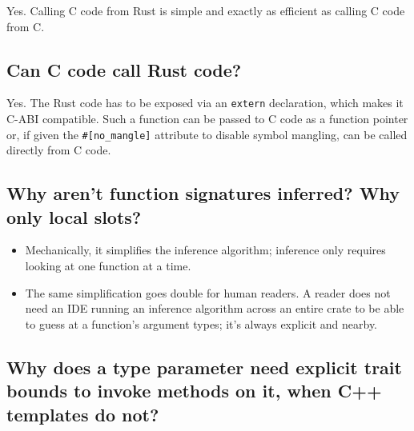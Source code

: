 \documentclass[]{article}
\begin{document}
Yes. Calling C code from Rust is simple and exactly as efficient as
calling C code from C.

\subsection{Can C code call Rust code?}\label{can-c-code-call-rust-code}

Yes. The Rust code has to be exposed via an \texttt{extern} declaration,
which makes it C-ABI compatible. Such a function can be passed to C code
as a function pointer or, if given the \texttt{\#{[}no\_mangle{]}}
attribute to disable symbol mangling, can be called directly from C
code.

\subsection{Why aren't function signatures inferred? Why only local
slots?}\label{why-arent-function-signatures-inferred-why-only-local-slots}

\begin{itemize}
\itemsep1pt\parskip0pt
\item
  Mechanically, it simplifies the inference algorithm; inference only
  requires looking at one function at a time.
\item
  The same simplification goes double for human readers. A reader does
  not need an IDE running an inference algorithm across an entire crate
  to be able to guess at a function's argument types; it's always
  explicit and nearby.
\end{itemize}

\subsection{Why does a type parameter need explicit trait bounds to
invoke methods on it, when C++ templates do
not?}\label{why-does-a-type-parameter-need-explicit-trait-bounds-to-invoke-methods-on-it-when-c-templates-do-not}
\end{document}
